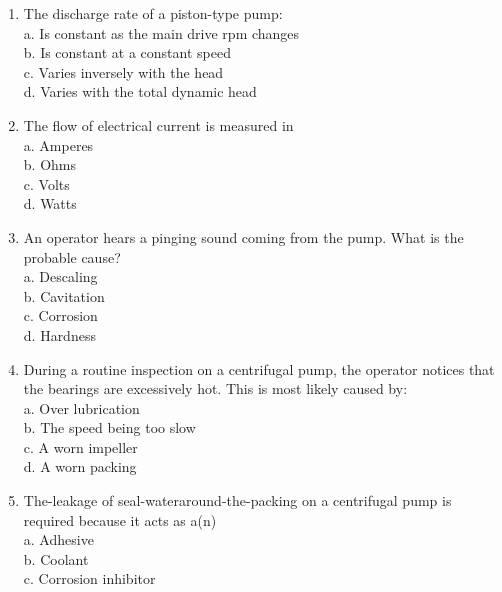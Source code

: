 \begin{enumerate}[1.]
\item The discharge rate of a piston-type pump:\\

a. Is constant as the main drive rpm changes\\

b. Is constant at a constant speed\\

c. Varies inversely with the head\\

d. Varies with the total dynamic head\\

  \item The flow of electrical current is measured in\\
a. Amperes\\

b. Ohms\\

c. Volts\\

d. Watts\\


\item An operator hears a pinging sound coming from the pump. What is the probable cause?\\
a.	Descaling\\
b. Cavitation\\
c. Corrosion \\
d. Hardness\\

\item During a routine inspection on a centrifugal pump, the operator notices that the bearings are excessively hot. This is most likely caused by:\\
a. Over lubrication\\
b. The speed being too slow\\
c. A worn impeller\\
d. A worn packing\\

\item The-leakage of seal-wateraround-the-packing on a centrifugal pump is required because it acts as a(n)\\

a. Adhesive\\

b. Coolant\\

c. Corrosion inhibitor\\


\end{enumerate}
